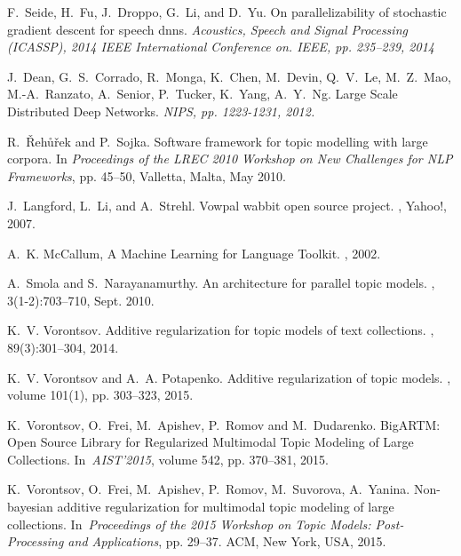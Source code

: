 \documentclass[russian,english]{llncs}
\begin{document}
\begin{thebibliography}{10}
F.~Seide, H.~Fu, J.~Droppo, G.~Li, and D.~Yu.
\newblock On parallelizability of stochastic gradient descent for speech dnns.
\newblock \em{Acoustics, Speech and Signal Processing (ICASSP), 2014 IEEE International Conference on. IEEE}, pp. 235–239, 2014

J.~Dean, G.~S.~Corrado, R.~Monga, K.~Chen, M.~Devin, Q.~V.~Le, M.~Z.~Mao, M.-A.~Ranzato, A.~Senior, P.~Tucker, K.~Yang, A.~Y.~Ng.
\newblock Large Scale Distributed Deep Networks.
\newblock \em{NIPS}, pp. 1223-1231, 2012.

R.~\v{R}eh\r{u}\v{r}ek and P.~Sojka.
\newblock Software framework for topic modelling with large corpora.
\newblock In {\em Proceedings of the {LREC} 2010 Workshop on New Challenges for
	{NLP} Frameworks}, pp. 45--50, Valletta, Malta, May 2010.


J.~Langford, L.~Li, and A.~Strehl.
\newblock Vowpal wabbit open source project.
, Yahoo!, 2007.

A.~K. McCallum,
\newblock A Machine Learning for Language Toolkit.
, 2002.
   
A.~Smola and S.~Narayanamurthy.
\newblock An architecture for parallel topic models.
, 3(1-2):703--710, Sept. 2010.

K.~V. Vorontsov.
\newblock Additive regularization for topic models of text collections.
, 89(3):301--304, 2014.

K.~V. Vorontsov and A.~A. Potapenko.
\newblock Additive regularization of topic models.
, volume 101(1), pp. 303--323, 2015.

K.~Vorontsov, O.~Frei, M.~Apishev, P.~Romov and M.~Dudarenko.
\newblock BigARTM: Open Source Library for Regularized Multimodal Topic Modeling of Large Collections.
\newblock In~{\em AIST'2015}, volume 542, pp. 370--381, 2015.

K.~Vorontsov, O.~Frei, M.~Apishev, P.~Romov, M.~Suvorova, A.~Yanina.
\newblock Non-bayesian additive regularization for multimodal topic modeling of large
collections.
\newblock In~{\em Proceedings of the 2015 Workshop on Topic Models:
Post-Processing and Applications}, pp. 29--37. ACM, New York, USA, 2015.

\end{thebibliography}
\end{document}
